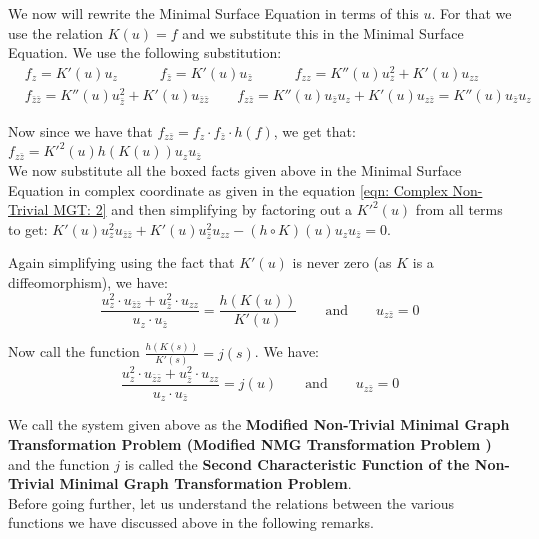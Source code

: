 \documentclass[12pt]{article}
\theoremstyle{plain}
\theoremstyle{definition}
\theoremstyle{remark}
\begin{document}
  We now will rewrite the Minimal Surface Equation in terms of this \(u\). For that we use the relation \(K(u)=f\) and we substitute this in the Minimal Surface Equation. We use the following substitution:
  \begin{align}
  	\label{eqn: partial derivatives of f}
  	&\boxed{f_z=K'(u)u_z} \quad\quad\quad \boxed{f_{\bar{z}}=K'(u) u_{\bar{z}}} \quad\quad\quad \boxed{f_{zz}=K''(u) u_z^2+K'(u)u_{zz}}\\
  	\label{eqn: second partial derivatives of f}
  	&\boxed{f_{\bar{z}\bar{z}}=K''(u)u_{\bar{z}}^2+K'(u)u_{\bar{z}\bar{z}}} \quad\quad \boxed{f_{z\bar{z}}=K''(u)u_{\bar{z}}u_z+K'(u)u_{z\bar{z}}=K''(u)u_{\bar{z}}u_z}    
  \end{align}
  
  Now since we have that \(f_{z\bar{z}}=f_z\cdot f_{\bar{z}}\cdot h(f)\), we get that: $\boxed{f_{z\bar{z}}={K'}^2(u) h(K(u)) u_z u_{\bar{z}}}$\\
   
  
  We now substitute all the boxed facts given above in the Minimal Surface Equation in complex coordinate as given in the equation \ref{eqn: Complex Non-Trivial MGT: 2} and then simplifying by factoring out a \({K'}^2(u)\) from all terms to get: \(K'(u) u_z^2 u_{\bar{z}\bar{z}}+K'(u) u_{\bar{z}}^2 u_{zz}-(h\circ K)(u)u_z u_{\bar{z}}=0\).
  
  Again simplifying using the fact that \(K'(u)\) is never zero (as \(K\) is a diffeomorphism), we have:
  \[
  \frac{u_z^2\cdot u_{\bar{z}\bar{z}}+ u_{\bar{z}}^2\cdot u_{zz}}{u_z \cdot u_{\bar{z}}}=\frac{h(K(u))}{K'(u)} \quad\quad\text{and}\quad\quad u_{z\bar{z}}=0
  \]
  
  Now call the function \(\frac{h(K(s))}{K'(s)}=j(s)\). We have:
  \begin{equation}
  	\label{eqn: Modified Complex Non-Trivial MGT: 2}
  	\boxed{\frac{u_z^2\cdot u_{\bar{z}\bar{z}}+ u_{\bar{z}}^2\cdot u_{zz}}{u_z \cdot u_{\bar{z}}}=j(u)} \quad\quad\text{and}\quad\quad \boxed{u_{z\bar{z}}=0}    
  \end{equation}
  
  We call the system given above as the \textbf{Modified Non-Trivial Minimal Graph Transformation Problem (Modified NMG Transformation Problem )} and the function \(j\) is called the \textbf{Second Characteristic Function of the Non-Trivial Minimal Graph Transformation Problem}.\\
  
Before going further, let us understand the relations between the various functions we have discussed above in the following remarks.
\end{document}
